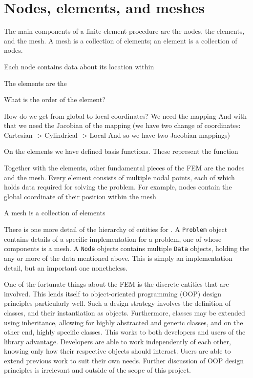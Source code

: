 
\section{Nodes, elements, and meshes}

The main components of a finite element procedure are the nodes, the elements, and the mesh.
A mesh is a collection of elements; an element is a collection of nodes.

Each node contains data about its location within 

The elements are the 

What is the order of the element?

How do we get from global to local coordinates?
We need the mapping
And with that we need the Jacobian of the mapping
(we have two change of coordinates: Cartesian -> Cylindrical -> Local
And so we have two Jacobian mappings)

On the elements we have defined basis functions.
These represent the function 

Together with the elements, other fundamental pieces of the FEM are the nodes and the mesh.
Every element consists of multiple nodal points, each of which holds data required for solving the problem.
For example, nodes contain the global coordinate of their position within the mesh

A mesh is a collection of elements


There is one more detail of the hierarchy of entities for \oomph.
A \texttt{Problem} object contains details of a specific implementation for a problem, one of whose components is a mesh.
A \texttt{Node} objects contains multiple \texttt{Data} objects, holding the any or more of the data mentioned above.
This is simply an implementation detail, but an important one nonetheless. 


One of the fortunate things about the FEM is the discrete entities that are involved.
This lends itself to object-oriented programming (OOP) design principles particularly well.
Such a design strategy involves the definition of classes, and their instantiation as objects.
Furthermore, classes may be extended using inheritance, allowing for highly abstracted and generic classes, and on the other end, highly specific classes.
This works to both developers and users of the library advantage.
Developers are able to work independently of each other, knowing only how their respective objects should interact.
Users are able to extend previous work to suit their own needs.
Further discussion of OOP design principles is irrelevant and outside of the scope of this project.





